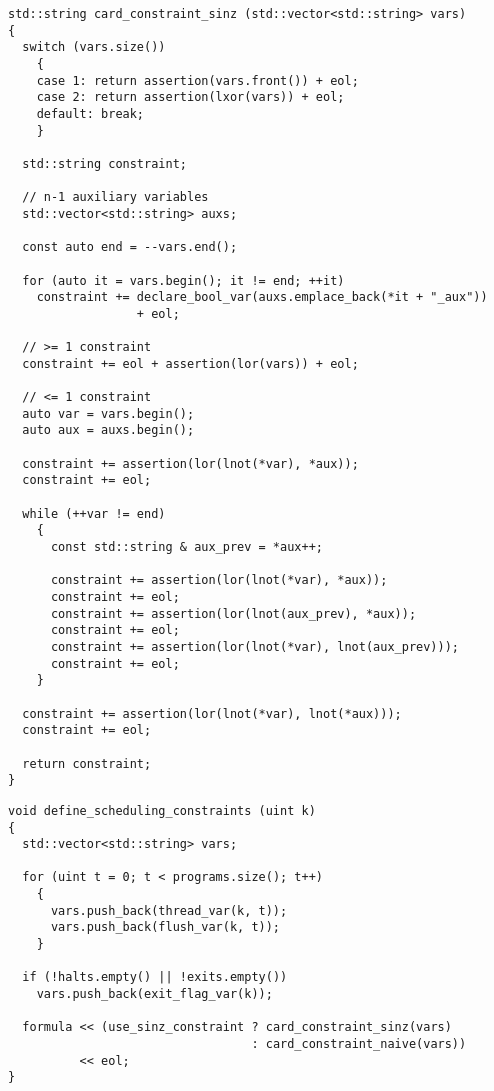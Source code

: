 \begin{lstlisting}[style=c++]
std::string card_constraint_sinz (std::vector<std::string> vars)
{
  switch (vars.size())
    {
    case 1: return assertion(vars.front()) + eol;
    case 2: return assertion(lxor(vars)) + eol;
    default: break;
    }

  std::string constraint;

  // n-1 auxiliary variables
  std::vector<std::string> auxs;

  const auto end = --vars.end();

  for (auto it = vars.begin(); it != end; ++it)
    constraint += declare_bool_var(auxs.emplace_back(*it + "_aux"))
                  + eol;

  // >= 1 constraint
  constraint += eol + assertion(lor(vars)) + eol;

  // <= 1 constraint
  auto var = vars.begin();
  auto aux = auxs.begin();

  constraint += assertion(lor(lnot(*var), *aux));
  constraint += eol;

  while (++var != end)
    {
      const std::string & aux_prev = *aux++;

      constraint += assertion(lor(lnot(*var), *aux));
      constraint += eol;
      constraint += assertion(lor(lnot(aux_prev), *aux));
      constraint += eol;
      constraint += assertion(lor(lnot(*var), lnot(aux_prev)));
      constraint += eol;
    }

  constraint += assertion(lor(lnot(*var), lnot(*aux)));
  constraint += eol;

  return constraint;
}
\end{lstlisting}

\begin{lstlisting}[style=c++]
void define_scheduling_constraints (uint k)
{
  std::vector<std::string> vars;

  for (uint t = 0; t < programs.size(); t++)
    {
      vars.push_back(thread_var(k, t));
      vars.push_back(flush_var(k, t));
    }

  if (!halts.empty() || !exits.empty())
    vars.push_back(exit_flag_var(k));

  formula << (use_sinz_constraint ? card_constraint_sinz(vars)
                                  : card_constraint_naive(vars))
          << eol;
}
\end{lstlisting}

